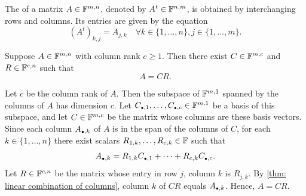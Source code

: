 \setcounter{thm}{53}
\begin{mydef}[transpose, $A^t$]
  \label{def: transpose}
  The  of a matrix $A\in \mathbb{F}^{m,n}$, denoted by $A^t\in \mathbb{F}^{n,m}$, is obtained by interchanging rows and columns. Its entries are given by the equation
  \begin{equation}
    \left( A^{t} \right)_{k,j} = A_{j,k} \quad \forall k \in \{1, \ldots, n\}, j \in \{1, \ldots, m\}.
  \end{equation}
\end{mydef}

\setcounter{thm}{55}
\begin{thm}
  \label{thm: column-row factorization}
  Suppose $A \in \mathbb{F}^{m,n}$ with column rank $c \geq 1$. Then there exist $C\in \mathbb{F}^{m,c}$ and $R\in \mathbb{F}^{c,n}$ such that
  \begin{equation}
    A = CR.
  \end{equation}
\end{thm}
\begin{prf}
  Let $c$ be the column rank of $A$. Then the subspace of $\mathbb{F}^{m,1}$ spanned by the columns of $A$ has dimension $c$. Let $C_{\mathsmaller{\bullet}, 1}, \ldots, C_{\mathsmaller{\bullet}, c} \in \myF^{m,1}$ be a basis of this subspace, and let $C \in \mathbb{F}^{m,c}$ be the matrix whose columns are these basis vectors.
  Since each column $A_{\mathsmaller{\bullet}, k}$ of $A$ is in the span of the columns of $C$, for each $k \in \{1, \ldots, n\}$ there exist scalars $R_{1,k}, \ldots, R_{c,k} \in \mathbb{F}$ such that
  \begin{equation}
    A_{\mathsmaller{\bullet}, k} = R_{1,k} C_{\mathsmaller{\bullet}, 1} + \cdots + R_{c,k} C_{\mathsmaller{\bullet}, c}.
  \end{equation}
  Let $R \in \mathbb{F}^{c,n}$ be the matrix whose entry in row $j$, column $k$ is $R_{j,k}$. By \ref{thm: linear combination of columns}, column $k$ of $CR$ equals $A_{\mathsmaller{\bullet}, k}$. Hence, $A = CR$.
\end{prf}


